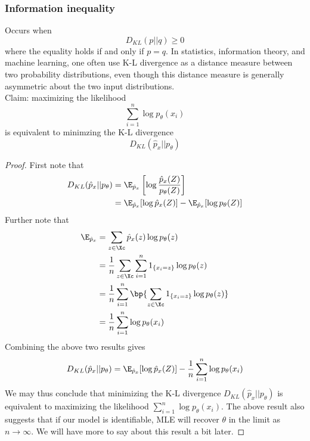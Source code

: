 \subsubsection{Information inequality}
Occurs when
\[
    D_{KL}(p || q) \geq 0
\]
where the equality holds if and only if $p=q$. In statistics, information theory, and machine learning, one often use K-L divergence as a distance measure between two probability
distributions, even though this distance measure is generally asymmetric about the two input distributions. \\

\noindent Claim: maximizing the likelihood
\[
    \sum_{i=1}^n \log p_\theta(x_i)
\]
is equivalent to minimzing the K-L divergence
\[
    D_{KL}(\hat{p}_x || p_\theta)
\]
\begin{proof}
    First note that
    \begin{align*}
        D_{KL}(\hat{p}_x || p_\theta) & = \E_{\hat{p}_x} \left[ \log \frac{\hat{p}_x(Z)}{p_\theta(Z)}\right]   \\
                                      & = \E_{\hat{p}_x} [\log\hat{p}_x(Z)] - \E_{\hat{p}_x}[\log p_\theta(Z)]
    \end{align*}
    Further note that
    \begin{align*}
        \E_{\hat{p}_x} & = \sum_{z\in\Xc} \hat{p}_x(z)\log p_{\theta}(z)                               \\
                       & = \frac{1}{n} \sum_{z\in\Xc}\sum_{i=1}^n 1_{\{ x_i=z \}} \log p_\theta(z)     \\
                       & = \frac{1}{n} \sum_{i=1}^n \bp{\sum_{z\in\Xc} 1_{\{x_i=z\}} \log p_\theta(z)} \\
                       & = \frac{1}{n} \sum_{i=1}^n \log p_\theta(x_i)
    \end{align*}
    Combining the above two results gives
    \[
        D_{KL}(\hat{p}_x || p_\theta) = \E_{\hat{p}_x}[\log \hat{p}_x (Z)] - \frac{1}{n} \sum_{i=1}^n \log p_\theta(x_i)
    \]
    We may thus conclude that minimizing the K-L divergence $D_{KL}(\hat{p}_x || p_\theta)$ is equivalent to
    maximizing the likelihood $\sum_{i=1}^n \log p_\theta(x_i)$. The above result also suggests that if
    our model is identifiable, MLE will recover $\theta$ in the limit as $n \to \infty$. We will have more
    to say about this result a bit later.
\end{proof}

